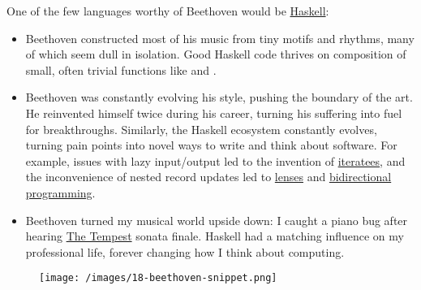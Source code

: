 \documentclass{article}
\begin{document}
One of the few languages worthy of Beethoven would be \href{https://www.haskell.org/}{Haskell}:
\begin{itemize}
  \item
  Beethoven constructed most of his music from tiny motifs and rhythms, many of which seem dull in isolation.
  Good Haskell code thrives on composition of small, often trivial functions like \href{https://hackage.haskell.org/package/base-4.18.0.0/docs/Prelude.html#v:id}{} and \href{https://hackage.haskell.org/package/base-4.18.0.0/docs/Data-Function.html#v:fix}{}.
  \item
  Beethoven was constantly evolving his style, pushing the boundary of the art.
  He reinvented himself twice during his career, turning his suffering into fuel for breakthroughs.
  Similarly, the Haskell ecosystem constantly evolves, turning pain points into novel ways to write and think about software.
  For example,
  issues with lazy input/output led to the invention of \href{https://wiki.haskell.org/Iteratee_I/O}{iteratees},
  and the inconvenience of nested record updates led to \href{https://www.youtube.com/watch?v=k-QwBL9Dia0}{lenses} and \href{https://www.cis.upenn.edu/~bcpierce/papers/icmt-2009-slides.pdf}{bidirectional programming}.
  \item
  Beethoven turned my musical world upside down:
  I caught a piano bug after hearing \href{https://en.wikipedia.org/wiki/Piano_Sonata_No._17_(Beethoven)}{The Tempest} sonata finale.
  Haskell had a matching influence on my professional life,
  forever changing how I think about computing.
\end{itemize}

\begin{figure}[grayscale-diagram]
  \texttt{[image: /images/18-beethoven-snippet.png]}
\end{figure}
\end{document}
